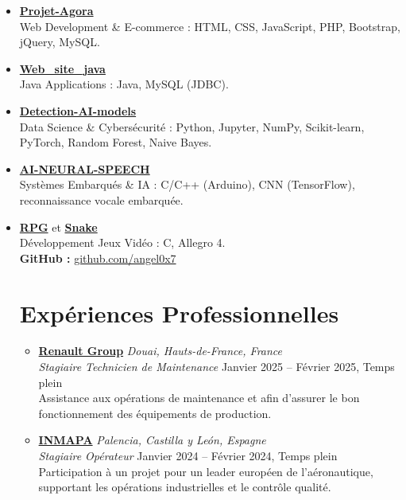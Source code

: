 \documentclass[a4paper,10pt]{article}
\begin{document}
\begin{itemize}[leftmargin=*]
  \item \href{https://github.com/angel0x7/Projet-Agora}{\textbf{Projet-Agora}} \\
  Web Development \& E-commerce : HTML, CSS, JavaScript, PHP, Bootstrap, jQuery, MySQL.

  \item \href{https://github.com/angel0x7/Web_site_java}{\textbf{Web\_site\_java}} \\
  Java Applications : Java, MySQL (JDBC).

  \item \href{https://github.com/angel0x7/Detection-AI-models-}{\textbf{Detection-AI-models}} \\
  Data Science \& Cybersécurité : Python, Jupyter, NumPy, Scikit-learn, PyTorch, Random Forest, Naive Bayes.

  \item \href{https://github.com/angel0x7/AI-NEURAL-SPEECH-}{\textbf{AI-NEURAL-SPEECH}} \\
  Systèmes Embarqués \& IA : C/C++ (Arduino), CNN (TensorFlow), reconnaissance vocale embarquée.

  \item \href{https://github.com/angel0x7/Role-playing-video-game}{\textbf{RPG}} et \href{https://github.com/angel0x7/snake_jeu_allegro}{\textbf{Snake}} \\
  Développement Jeux Vidéo : C, Allegro 4.\\

\noindent
\textbf{GitHub :} \href{https://github.com/angel0x7}{github.com/angel0x7}
\section*{Expériences Professionnelles}

\begin{itemize}[leftmargin=*]

  \item
  \textbf{\href{https://www.renaultgroup.com/}{Renault Group}} \hfill \emph{Douai, Hauts-de-France, France} \\
  \emph{Stagiaire Technicien de Maintenance} \hfill Janvier 2025 – Février 2025, Temps plein \\
  Assistance aux opérations de maintenance et  afin d'assurer le bon fonctionnement des équipements de production.

\item
  \textbf{\href{https://www.inmapa.com/en/}{INMAPA}} \hfill \emph{Palencia, Castilla y León, Espagne} \\
  \emph{Stagiaire Opérateur} \hfill Janvier 2024 – Février 2024, Temps plein \\
  Participation à un projet pour un leader européen de l’aéronautique, supportant les opérations industrielles et le contrôle qualité.


\end{itemize}
\end{itemize}
\end{document}
